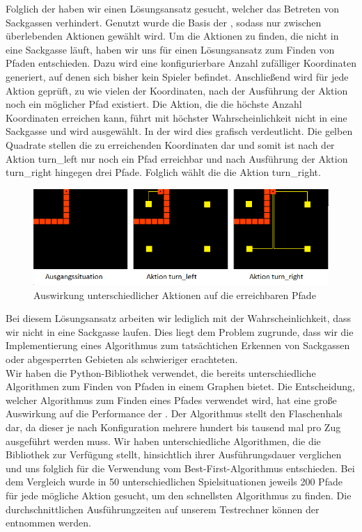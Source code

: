 Folglich der  haben wir einen Lösungsansatz gesucht, welcher das Betreten von Sackgassen
verhindert.
Genutzt wurde die Basis der , sodass nur zwischen überlebenden Aktionen gewählt wird.
Um die Aktionen zu finden, die nicht in eine Sackgasse läuft, haben wir uns für einen Lösungsansatz zum Finden von
Pfaden entschieden.
Dazu wird eine konfigurierbare Anzahl zufälliger Koordinaten generiert, auf denen sich bisher kein Spieler befindet.
Anschließend wird für jede Aktion geprüft, zu wie vielen der Koordinaten, nach der Ausführung der Aktion noch ein
möglicher Pfad existiert.
Die Aktion, die die höchste Anzahl Koordinaten erreichen kann, führt mit höchster Wahrscheinlichkeit
nicht in eine Sackgasse und wird ausgewählt.
In der  wird dies grafisch verdeutlicht.
Die gelben Quadrate stellen die zu erreichenden Koordinaten dar und somit ist nach der Aktion turn\_left nur noch ein
Pfad erreichbar und nach Ausführung der Aktion turn\_right hingegen drei Pfade.
Folglich wählt die  die Aktion turn\_right.

\begin{figure}[htb]
    \centering
    \includegraphics{Bilder/pathfinding_example.png}
    \caption{Auswirkung unterschiedlicher Aktionen auf die erreichbaren Pfade}
    \label{fig:sackgasse-pfade}
\end{figure}

Bei diesem Lösungsansatz arbeiten wir lediglich mit der Wahrscheinlichkeit, dass wir nicht in eine Sackgasse laufen.
Dies liegt dem Problem zugrunde, dass wir die Implementierung eines Algorithmus zum tatsächtichen Erkennen von
Sackgassen oder abgesperrten Gebieten als schwieriger erachteten. \\

Wir haben die Python-Bibliothek  verwendet, die bereits unterschiedliche Algorithmen zum Finden von
Pfaden in einem Graphen bietet.
Die Entscheidung, welcher Algorithmus zum Finden eines Pfades verwendet wird, hat eine große Auswirkung auf die
Performance der .
Der Algorithmus stellt den Flaschenhals dar, da dieser je nach Konfiguration mehrere hundert bis tausend mal pro
Zug ausgeführt werden muss.
Wir haben unterschiedliche Algorithmen, die die Bibliothek zur Verfügung stellt, hinsichtlich ihrer Ausführungsdauer verglichen und uns folglich für die
Verwendung vom Best-First-Algorithmus entschieden.
Bei dem Vergleich wurde in 50 unterschiedlichen Spielsituationen jeweils 200 Pfade für jede mögliche Aktion gesucht, um
den schnellsten Algorithmus zu finden.
Die durchschnittlichen Ausführungzeiten auf unserem Testrechner können der
 entnommen werden.

